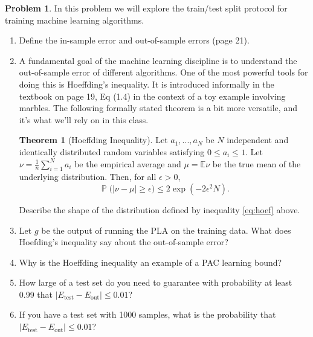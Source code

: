 \documentclass[10pt]{exam}
\theoremstyle{definition}
\newtheorem{problem}{Problem}
\newtheorem{theorem}{Theorem}
\newcommand{\E}{\mathbb E}
\DeclareMathOperator{\prob}{\mathbb P}
\newcommand{\Eout}{E_{\text{out}}}
\newcommand{\Etest}{E_{\text{test}}}
\begin{document}
\newpage
\begin{problem}
    In this problem we will explore the train/test split protocol for training machine learning algorithms.
    \begin{enumerate}
        \item Define the in-sample error and out-of-sample errors (page 21).
            \vspace{3in}
        \item A fundamental goal of the machine learning discipline is to understand the out-of-sample error of different algorithms.
            One of the most powerful tools for doing this is Hoeffding's inequality.
            It is introduced informally in the textbook on page 19, Eq (1.4) in the context of a toy example involving marbles.
            The following formally stated theorem is a bit more versatile, and it's what we'll rely on in this class.
            \begin{theorem}[Hoeffding Inequality]
                Let $a_1, ..., a_N$ be $N$ independent and identically distributed random variables satisfying $0 \le a_i \le 1$.
                Let $\nu = \tfrac1n\sum_{i=1}^N a_i$ be the empirical average and $\mu = \E \nu$ be the true mean of the underlying distribution.
                Then, for all $\epsilon > 0$,
                \begin{equation}
                    \label{eq:hoef}
                    \prob\big(|\nu - \mu| \ge \epsilon\big)
                    \le 
                    2 \exp (-2\epsilon^2 N)
                    .
                \end{equation}
            \end{theorem}
            Describe the shape of the distribution defined by inequality \ref{eq:hoef} above.

        \newpage
        \item Let $g$ be the output of running the PLA on the training data.
            What does Hoefding's inequality say about the out-of-sample error?
            \vspace{6in}

        \item Why is the Hoeffding inequality an example of a PAC learning bound?
            \vspace{4in}

            \newpage
        \item How large of a test set do you need to guarantee with probability at least 0.99 that $|\Etest-\Eout| \le 0.01$?
            \vspace{4in}

        \item If you have a test set with 1000 samples, what is the probability that $|\Etest-\Eout| \le 0.01$?
    \end{enumerate}
\end{problem}
\end{document}
